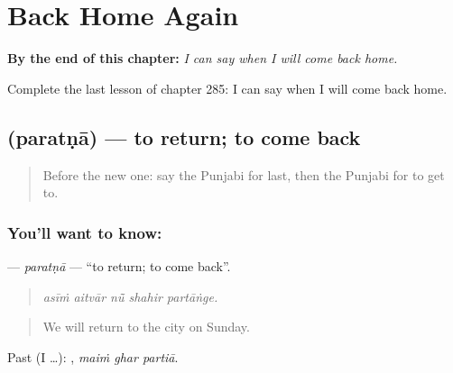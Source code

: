 
\chapter{Back Home Again}
\label{ch:pa-a2-back-home-again}

\begin{chapteropening}
\textbf{By the end of this chapter:} \emph{I can say when I will come back home.}

Complete the last lesson of chapter 285: I can say when I will come back home.
\end{chapteropening}

\section[\texorpdfstring{\pa{ਪਰਤਣਾ} (paratṇā)}{ਪਰਤਣਾ (paratṇā)}]{ (paratṇā) — to return; to come back}

\label{lesson:PA-C285-paratna}



\begin{quote}
Before the new one: say the Punjabi for last, then the Punjabi for to get to.
\end{quote}

\subsection*{You'll want to know: }
\textbf{} — \emph{paratṇā} — \textquotedblleft{}to return; to come back\textquotedblright{}.

\begin{quote}
    
\end{quote}

\begin{quote}
\emph{asīṁ aitvār nū̃ shahir partāṅge.}
\end{quote}

\begin{quote}
We will return to the city on Sunday.
\end{quote}

Past (I …):   , \emph{maiṁ ghar partiā}.

